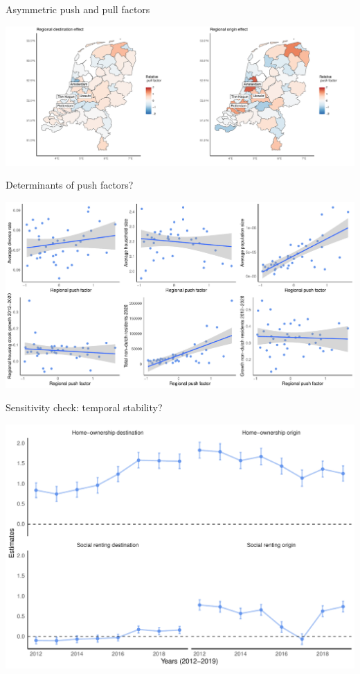 \documentclass{beamer}
\begin{document}
\begin{frame}{Asymmetric push and pull factors}
	\begin{center}
	\includegraphics[width=1\textwidth]{../../fig/attractivity_region}
\end{center}
\end{frame}

\begin{frame}{Determinants of push factors?}
	\begin{center}
		\includegraphics[width=1\textwidth]{../../fig/regional_out_plot}
	\end{center}
\end{frame}

\begin{frame}{Sensitivity check: temporal stability?}
			\begin{center}
	\includegraphics[width=\textwidth]{../../fig/temporal_variation}
\end{center}
\end{frame}
\end{document}
